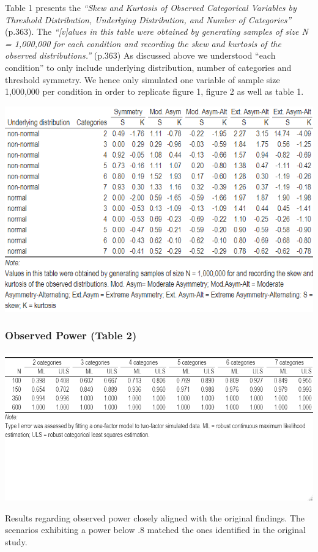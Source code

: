 \documentclass[10,a4paperpaper,]{article}
\begin{document}
Table 1 presents the \emph{``Skew and Kurtosis of Observed Categorical
Variables by Threshold Distribution, Underlying Distribution, and Number
of Categories''} (p.363). The \emph{``{[}v{]}alues in this table were
obtained by generating samples of size N = 1,000,000 for each condition
and recording the skew and kurtosis of the observed distributions.''}
(p.363) As discussed above we understood ``each condition'' to only
include underlying distribution, number of categories and threshold
symmetry. We hence only simulated one variable of sample size 1,000,000
per condition in order to replicate figure 1, figure 2 as well as table
1.

\includegraphics[width=385pt]{./figures/table1}

\subsubsection{Observed Power (Table 2)}

\includegraphics[width=385pt]{./figures/table2}

Results regarding observed power closely aligned with the original
findings. The scenarios exhibiting a power below .8 matched the ones
identified in the original study.
\end{document}
